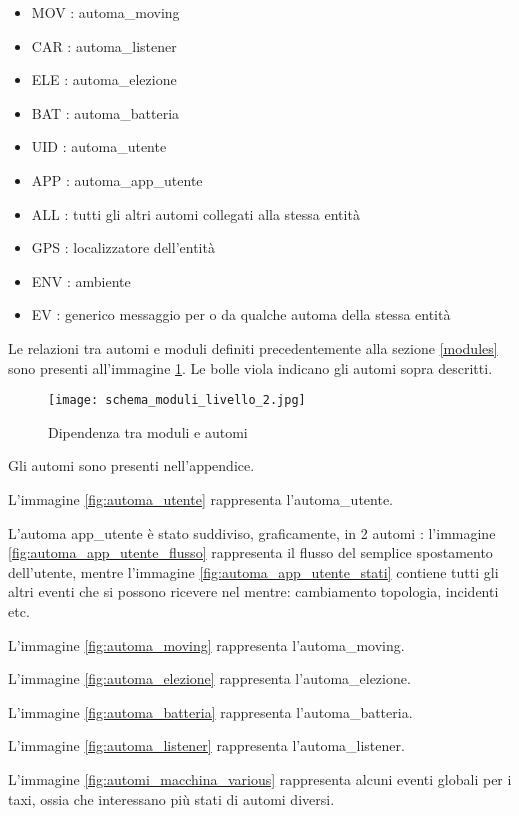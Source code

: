 \begin{itemize}
	\item MOV : automa\_moving
	\item CAR : automa\_listener
	\item ELE : automa\_elezione
	\item BAT :	automa\_batteria
	\item UID : automa\_utente
	\item APP : automa\_app\_utente
	\item ALL : tutti gli altri automi collegati alla stessa entità
	\item GPS : localizzatore dell'entità
	\item ENV : ambiente
	\item EV  : generico messaggio per o da qualche automa della stessa entità
\end{itemize}

Le relazioni tra automi e moduli definiti precedentemente alla sezione \ref{modules} sono presenti all'immagine \ref{fig:schema_moduli_livello_2}. Le bolle viola indicano gli automi sopra descritti.

\begin{figure}[htbp]
	\centering
	\texttt{[image: schema\_moduli\_livello\_2.jpg]}
	\caption{Dipendenza tra moduli e automi}
	\label{fig:schema_moduli_livello_2}
\end{figure}

Gli automi sono presenti nell'appendice.

L'immagine \ref{fig:automa_utente} rappresenta l'automa\_utente.

L'automa app\_utente è stato suddiviso, graficamente, in 2 automi : l'immagine \ref{fig:automa_app_utente_flusso}  rappresenta il flusso del semplice spostamento dell'utente, mentre l'immagine \ref{fig:automa_app_utente_stati} contiene tutti gli altri eventi che si possono ricevere nel mentre: cambiamento topologia, incidenti etc.

L'immagine \ref{fig:automa_moving} rappresenta l'automa\_moving.

L'immagine \ref{fig:automa_elezione} rappresenta l'automa\_elezione.

L'immagine \ref{fig:automa_batteria} rappresenta l'automa\_batteria.

L'immagine \ref{fig:automa_listener} rappresenta l'automa\_listener.

L'immagine \ref{fig:automi_macchina_various} rappresenta alcuni eventi globali per i taxi, ossia che interessano più stati di automi diversi.

